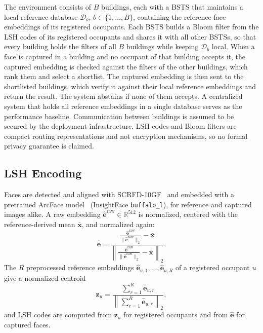 \documentclass[pdflatex,sn-mathphys-num]{sn-jnl}%
\providecommand{\code}[1]{\texttt{#1}}%
\theoremstyle{thmstyleone}%
\theoremstyle{thmstyletwo}%
\theoremstyle{thmstylethree}%
\begin{document}
The environment consists of $B$ buildings, each with a BSTS that maintains a local reference database $\mathcal{D}_b$, $b\in\{1,\ldots,B\}$, containing the reference face embeddings of its registered occupants. Each BSTS builds a Bloom filter from the LSH codes of its registered occupants and shares it with all other BSTSs, so that every building holds the filters of all $B$ buildings while keeping $\mathcal{D}_b$ local. When a face is captured in a building and no occupant of that building accepts it, the captured embedding is checked against the filters of the other buildings, which rank them and select a shortlist. The captured embedding is then sent to the shortlisted buildings, which verify it against their local reference embeddings and return the result. The system abstains if none of them accepts. A centralized system that holds all reference embeddings in a single database serves as the performance baseline. Communication between buildings is assumed to be secured by the deployment infrastructure. LSH codes and Bloom filters are compact routing representations and not encryption mechanisms, so no formal privacy guarantee is claimed.

\subsection{LSH Encoding}
\label{subsec:lsh_encoding}

Faces are detected and aligned with SCRFD-10GF~\cite{guo2022} and embedded with a pretrained ArcFace model~\cite{deng2019} (InsightFace \code{buffalo\_l}), for reference and captured images alike. A raw embedding $\hat{\mathbf{e}}^{\mathrm{raw}}\in\mathbb{R}^{512}$ is normalized, centered with the reference-derived mean $\bar{\mathbf{x}}$, and normalized again:
\begin{equation}
    \hat{\mathbf{e}}
    =
    \frac{
        \frac{\hat{\mathbf{e}}^{\mathrm{raw}}}{\|\hat{\mathbf{e}}^{\mathrm{raw}}\|_2}
        - \bar{\mathbf{x}}
    }{
        \left\|
        \frac{\hat{\mathbf{e}}^{\mathrm{raw}}}{\|\hat{\mathbf{e}}^{\mathrm{raw}}\|_2}
        - \bar{\mathbf{x}}
        \right\|_2
    }.
    \label{eq:embedding_preprocessing}
\end{equation}
The $R$ preprocessed reference embeddings $\hat{\mathbf{e}}_{u,1},\ldots,\hat{\mathbf{e}}_{u,R}$ of a registered occupant $u$ give a normalized centroid
\begin{equation}
    \mathbf{z}_u
    =
    \frac{
        \sum_{r=1}^{R}\hat{\mathbf{e}}_{u,r}
    }{
        \left\|\sum_{r=1}^{R}\hat{\mathbf{e}}_{u,r}\right\|_2
    },
    \label{eq:identity_centroid}
\end{equation}
and LSH codes are computed from $\mathbf{z}_u$ for registered occupants and from $\hat{\mathbf{e}}$ for captured faces.
\end{document}
